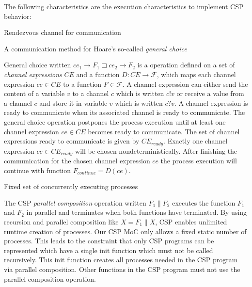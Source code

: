 The following characteristics are the execution characteristics to
implement CSP behavior:

\begin{characteristic}\label{characteristic-csp-rendezvous}
  Rendezvous channel for communication
\end{characteristic}

\begin{characteristic}\label{characteristic-csp-general-choice}
  A communication method for Hoare's so-called \emph{general choice}
  
  General choice written $ce_{1} \to F_1 \Box ce_{2} \to F_2$
  is a operation defined on a set of \emph{channel expressions} $CE$ and
  a function $D: CE \to \mathcal{F}$, which maps each channel expression
  $ce \in CE$ to a function $F \in \mathcal{F}$. A channel
  expression can either send the content of a variable $v$ to
  a channel $c$ which is written $c!v$ or receive a value from
  a channel $c$ and store it in variable $v$ which is written
  $c?v$. A channel expression is ready to communicate when its
  associated channel is ready to communicate.
  The general choice operation postpones the process execution 
  until at least one channel expression $ce \in CE$
  becomes ready to communicate. The set of channel expressions
  ready to communicate is given by $CE_{ready}$.
  Exactly one channel expression $ce \in CE_{ready}$
  will be chosen nondeterministically. After
  finishing the communication for the chosen channel expression $ce$
  the process execution will continue
  with function $F_{continue} = D(ce)$.

\end{characteristic}

\begin{characteristic}\label{characteristic-csp-concurrent-processes}
  Fixed set of concurrently executing processes
  
  The CSP \emph{parallel composition} operation written $F_1 \| F_2$ executes the
  function $F_1$ and $F_2$ in parallel and terminates when both functions
  have terminated. By using recursion and parallel composition
  like $X = F_1 \| X$, CSP enables unlimited runtime creation of processes.
  Our CSP MoC only allows a fixed static number of processes. This
  leads to the constraint that only CSP programs can be represented which
  have a single init function which must not be called recursively. This init
  function creates all processes needed in the CSP program via parallel composition.
  Other functions in the CSP program must not use the parallel composition
  operation.
\end{characteristic}

